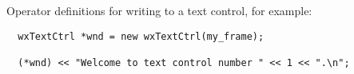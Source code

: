 \label{wxtextctrlinsert}







Operator definitions for writing to a text control, for example:

\begin{verbatim}
  wxTextCtrl *wnd = new wxTextCtrl(my_frame);

  (*wnd) << "Welcome to text control number " << 1 << ".\n";
\end{verbatim}


